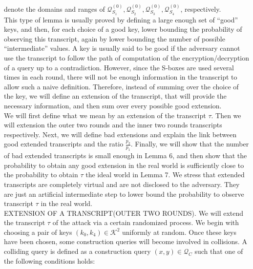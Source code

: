 \noindent denote the domains and ranges of $\mathcal{Q}_{S_{1}}^{(0)}, \mathcal{Q}_{S_{2}}^{(0)}, \mathcal{Q}_{S_{3}}^{(0)}, \mathcal{Q}_{S_{4}}^{(0)}$, respectively.\\
This type of lemma is usually proved by defining a large enough set of ``good'' keys, and then, for each choice of a good key, lower bounding the probability of observing this transcript, again by lower bounding the number of possible “intermediate” values. A key is usually said to be good if the adversary cannot use the transcript to follow the path of computation of the encryption/decryption of a query up to a contradiction. However, since the S-boxes are used several times in each round, there will not be enough information in the transcript to allow such a naive definition. Therefore, instead of summing over the choice of the key, we will define an extension of the transcript, that will provide the necessary information, and then sum over every possible good extension.\\
We will first define what we mean by an extension of the transcript $\tau$. Then we will extension the outer two rounds and the inner two rounds transcripts respectively. Next, we will define bad extensions and explain the link between good extended transcripts and the ratio $\frac{p_2}{p_1}$. Finally, we will show that the number of bad extended transcripts is small enough in Lemma 6, and then show that the probability to obtain any good extension in the real world is sufficiently close to the probability to obtain $\tau$ the ideal world in Lemma 7. We stress that extended transcripts are completely virtual and are not disclosed to the adversary. They are just an artificial intermediate step to lower bound the probability to observe transcript $\tau$ in the real world.\\

\noindent \textsc{EXTENSION OF A TRANSCRIPT(OUTER TWO ROUNDS)}. We will extend the transcript $\tau$ of the attack via a certain randomized process. We begin with choosing a pair of keys $\left(k_{0}, k_{4}\right) \in \mathcal{K}^{2}$ uniformly at random. Once these keys have been chosen, some construction queries will become involved in collisions. A colliding query is defined as a construction query $(x, y) \in \mathcal{Q}_{C}$ such that one of the following conditions holds:

